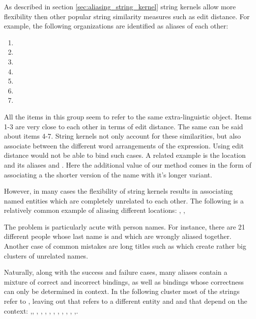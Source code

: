 As described in section \ref{sec:aliasing_string_kernel} string kernels allow more flexibility then other popular string similarity measures such as edit distance.
For example, the following organizations are identified as aliases of each other:
\begin{enumerate}
\item  {}
\item  {}
\item  {}
\item  {}
\item  {}
\item  {}
\item  {}
\end{enumerate}
All the items in this group seem to refer to the same extra-linguistic object. Items 1-3 are very close to each other in terms of edit distance.
The same can be said about items 4-7. String kernels not only account for these similarities, but also associate between the different word arrangements of the expression. Using edit distance would not be able to bind such cases. A related example is the location  and its aliases 
 and . Here the additional value of our method comes in the form of associating a the shorter version of the
name with it's longer variant. 

However, in many cases the flexibility of string kernels results in associating named entities which are completely unrelated to each other. The following is a relatively common example of aliasing different locations: , , 

The problem is particularly acute with person names. For instance, there are 21 different people whose last name is  and which are wrongly aliased together. Another case of common mistakes are long titles such as  which create rather big clusters of unrelated names.   
 
Naturally, along with the success and failure cases, many aliases contain a mixture of correct and incorrect bindings, as well as bindings whose correctness can only be determined in context. In the following cluster most of the strings refer to , leaving out  that refers to a different entity and  and  that depend on the context: ,, , , , , , , , , , ,.

